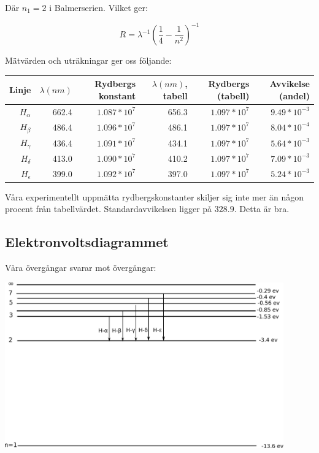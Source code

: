 \documentclass[a4paper,10pt]{article}
\begin{document}
Där $n_1 = 2$ i Balmerserien. Vilket ger:

$$ R = \lambda^{-1}\left(\frac{1}{4} - \frac{1}{n^2}\right)^{-1} $$

Mätvärden och uträkningar ger oss följande:

\begin{center}
\begin{tabular}[c]{|r||r|r||r|r||r|}
	\hline
	Linje & $\lambda (nm)$ & Rydbergs konstant & $\lambda (nm)$, tabell & Rydbergs (tabell) & Avvikelse (andel) \\
	\hline
	\hline
	$H_\alpha$ & 662.4 & $1.087*10^7$ & 656.3 & $1.097*10^7$ & $9.49*10^{-3}$ \\
	$H_\beta$ & 486.4 & $1.096*10^7$ & 486.1 & $1.097*10^7$ & $8.04*10^{-4}$ \\
	$H_\gamma$ & 436.4 & $1.091*10^7$ & 434.1 & $1.097*10^7$ & $5.64*10^{-3}$ \\
	$H_\delta$ & 413.0 & $1.090*10^7$ & 410.2 & $1.097*10^7$ & $7.09*10^{-3}$\\
	$H_\epsilon$ & 399.0 & $1.092*10^7$ & 397.0 & $1.097*10^7$ & $5.24*10^{-3}$ \\
	\hline
\end{tabular}
\end{center}

Våra experimentellt uppmätta rydbergskonstanter skiljer sig inte mer än någon procent från tabellvärdet. Standardavvikelsen ligger på $328.9$. Detta är bra.

\subsection{Elektronvoltsdiagrammet}

Våra övergångar svarar mot övergångar:

\begin{center}
\includegraphics[width=120mm]{als-elektron}
\end{center}
\end{document}
